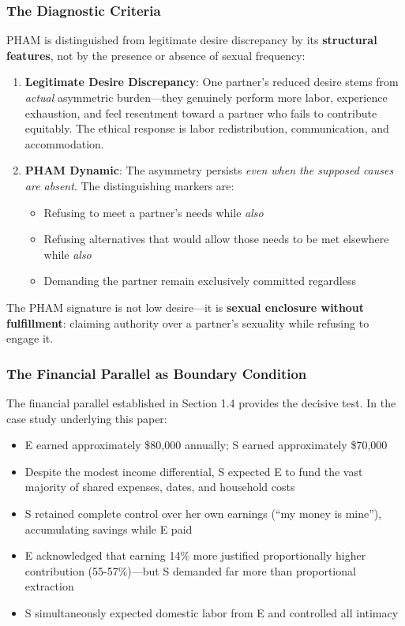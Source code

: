 \documentclass[12pt, letterpaper]{article}
\begin{document}
\subsubsection{The Diagnostic Criteria}

PHAM is distinguished from legitimate desire discrepancy by its \textbf{structural features}, not by the presence or absence of sexual frequency:

\begin{enumerate}
    \item \textbf{Legitimate Desire Discrepancy}: One partner's reduced desire stems from \textit{actual} asymmetric burden---they genuinely perform more labor, experience exhaustion, and feel resentment toward a partner who fails to contribute equitably. The ethical response is labor redistribution, communication, and accommodation.
    
    \item \textbf{PHAM Dynamic}: The asymmetry persists \textit{even when the supposed causes are absent}. The distinguishing markers are:
    \begin{itemize}
        \item Refusing to meet a partner's needs while \textit{also}
        \item Refusing alternatives that would allow those needs to be met elsewhere while \textit{also}
        \item Demanding the partner remain exclusively committed regardless
    \end{itemize}
\end{enumerate}

The PHAM signature is not low desire---it is \textbf{sexual enclosure without fulfillment}: claiming authority over a partner's sexuality while refusing to engage it.

\subsubsection{The Financial Parallel as Boundary Condition}

The financial parallel established in Section 1.4 provides the decisive test. In the case study underlying this paper:

\begin{itemize}
    \item E earned approximately \$80,000 annually; S earned approximately \$70,000
    \item Despite the modest income differential, S expected E to fund the vast majority of shared expenses, dates, and household costs
    \item S retained complete control over her own earnings (``my money is mine''), accumulating savings while E paid
    \item E acknowledged that earning 14\% more justified proportionally higher contribution (55-57\%)---but S demanded far more than proportional extraction
    \item S simultaneously expected domestic labor from E and controlled all intimacy
\end{itemize}
\end{document}
